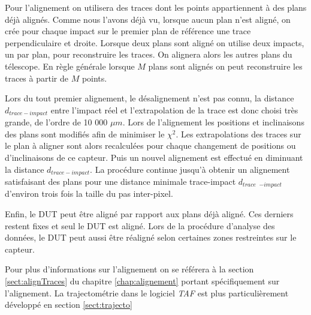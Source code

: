      \medskip

     Pour l'alignement on utilisera des traces dont les points appartiennent \`a des plans d\'ej\`a align\'es. Comme nous l'avons d\'ej\`a vu, lorsque aucun plan n'est align\'e, on cr\'ee pour chaque impact sur le premier plan de r\'ef\'erence une trace perpendiculaire et droite. Lorsque deux plans sont align\'e on utilise deux impacts, un par plan, pour reconstruire les traces. On alignera alors les autres plans du t\'elescope. En r\`egle g\'en\'erale lorsque $M$ plans sont align\'es on peut reconstruire les traces \`a partir de $M$ points.
     
     \medskip
     
     Lors du tout premier alignement, le d\'esalignement n'est pas connu, la distance $d_{trace-impact}$ entre l'impact r\'eel et l'extrapolation de la trace est donc choisi tr\`es grande, de l'ordre de 10 000 $\mu m$. Lors de l'alignement les positions et inclinaisons des plans sont modifi\'es afin de minimiser le $\chi^2$. Les extrapolations des traces sur le plan \`a aligner sont alors recalcul\'ees pour chaque changement de positions ou d'inclinaisons de ce capteur. Puis un nouvel alignement est effectu\'e en diminuant la distance $d_{trace-impact}$. La proc\'edure continue jusqu'à obtenir un alignement satisfaisant des plans pour une distance minimale trace-impact $d_{trace}$ $_{-impact}$ d'environ trois fois la taille du pas inter-pixel.
     
     \medskip
     
     Enfin, le DUT peut \^etre align\'e par rapport aux plans d\'ej\`a align\'e. Ces derniers restent fixes et seul le DUT est align\'e. Lors de la proc\'edure d'analyse des donn\'ees, le DUT peut aussi \^etre r\'ealign\'e selon certaines zones restreintes sur le capteur.
     
     \medskip
     
     Pour plus d'informations sur l'alignement on se référera à la section \ref{sect:alignTraces} du chapitre \ref{chap:alignement} portant sp\'ecifiquement sur l'alignement. La trajectom\'etrie dans le logiciel \textit{TAF} est plus particuli\`erement d\'evelopp\'e en section \ref{sect:trajecto}
     
     
     
